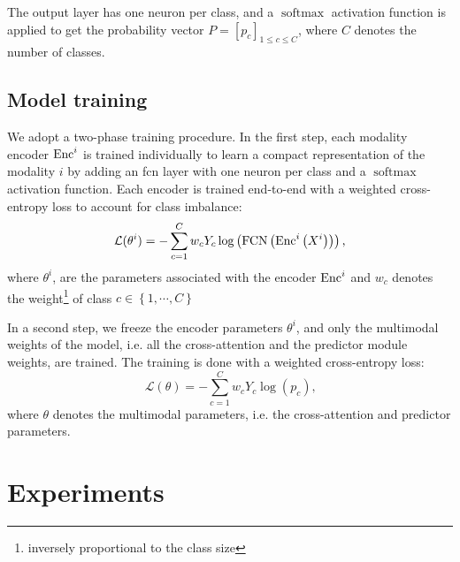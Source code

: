 \documentclass[../main.tex]{subfiles}
\begin{document}
	    The output layer has one neuron per class, and a \(\operatorname{softmax}\) activation function is applied to get the probability vector \({P = \left[p_c\right]_{1\leq c\leq C}}\), where \(C\) denotes the number of classes.

	\subsection{Model training}
	    We adopt a two-phase training procedure.
	    In the first step, each modality encoder \(\operatorname{Enc}^i\) is trained individually to learn a compact representation of the modality \(i\) by adding an \gls{fcn} layer with one neuron per class and a \(\operatorname{softmax}\) activation function.
	    Each encoder is trained end-to-end with a weighted cross-entropy loss to account for class imbalance:
	    \begin{equation*}
	        \mathcal{L}(\theta^{i}) = - \sum_{c=1}^{C}w_c Y_c \log\left( \operatorname{FCN}\left(\operatorname{Enc}^{i}\left(X^{i}\right)\right)\right) \text{,}
	    \end{equation*}
	    where \( \theta^{i}\), are the parameters associated with the encoder \(\operatorname{Enc}^{i}\) and \(w_c\) denotes the weight\footnote{inversely proportional to the class size} of class \(c \in \left\{1, \cdots,C \right\}\)

	    In a second step, we freeze the encoder parameters \(\theta^i\), and only the multimodal weights of the model, i.e. all the cross-attention and the predictor module weights, are trained.
	    The training is done with a weighted cross-entropy loss:
	    \begin{equation*}
	        \mathcal{L}(\theta) = - \sum_{c=1}^{C}w_c Y_c \log\left( p_c\right) \text{,}
	    \end{equation*}
	    where \(\theta\) denotes the multimodal parameters, i.e. the cross-attention and predictor parameters.

\section{Experiments}
\end{document}
